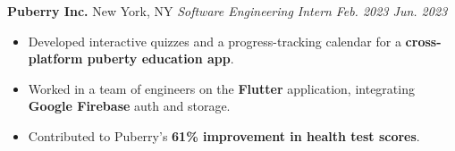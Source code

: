 \documentclass[11pt,letterpaper]{article}
\begin{document}
\begin{list}{}{\setlength{\leftmargin}{1em}\setlength{\rightmargin}{2pt}}
    \item
        \normalsize{\textbf{Puberry Inc.}} \hfill New York, NY
          \vspace{2pt} \newline
          \small{\textit{Software Engineering Intern}} \hfill \small{\textit{Feb. 2023 \textendash \space Jun. 2023}}
          \vspace{0pt}
          \begin{itemize}[itemsep=-4pt, topsep=-2pt]
              \item Developed interactive quizzes and a progress-tracking calendar for a \textbf{cross-platform puberty education app}.
              \item Worked in a team of engineers on the \textbf{Flutter} application, integrating \textbf{Google Firebase} auth and storage.
              \item Contributed to Puberry's \textbf{61\% improvement in health test scores}.
          \end{itemize}
\end{list}

\end{document}

